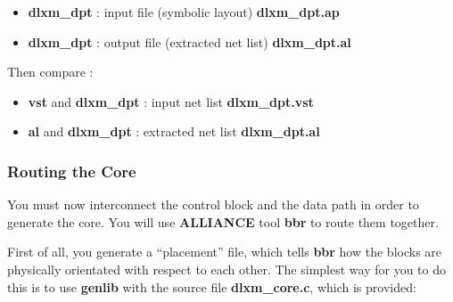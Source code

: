 
\begin{itemize}
\item
{\bf dlxm\_dpt} : input file (symbolic layout) {\bf dlxm\_dpt.ap}
\item
{\bf dlxm\_dpt} : output file (extracted net list) {\bf dlxm\_dpt.al}
\end{itemize}

Then compare :


\begin{itemize}
\item
{\bf vst} and {\bf dlxm\_dpt} : input net list {\bf dlxm\_dpt.vst}
\item
{\bf al} and {\bf dlxm\_dpt} : extracted net list {\bf dlxm\_dpt.al}
\end{itemize}



    		\subsubsection{Routing the Core}

You must now interconnect the control block and the data path in order to generate the core.
You will use {\bf ALLIANCE} tool {\bf bbr} to route them together.


First of all, you generate a ``placement'' file, which tells {\bf bbr}
how the blocks are physically orientated with respect to each other.
The simplest way for you to do this is to use {\bf genlib} with the
source file {\bf dlxm\_core.c}, which is provided:


